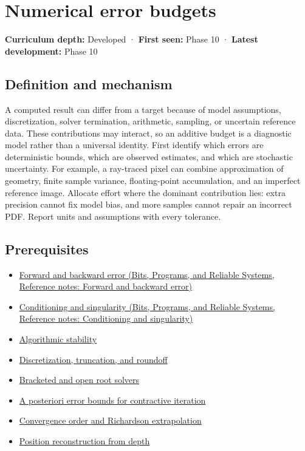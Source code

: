 \hypertarget{appendix-31b8c295e05f}{}\label{referencestart:appendix-31b8c295e05f}
\section{Numerical error budgets}\label{appendix-31b8c295e05f-numerical-error-budgets}

\textbf{Curriculum depth:} Developed · \textbf{First seen:} Phase 10 · \textbf{Latest development:} Phase 10

\subsection{Definition and mechanism}\label{appendix-31b8c295e05f-definition-and-mechanism}

A computed result can differ from a target because of model assumptions, discretization, solver termination, arithmetic, sampling, or uncertain reference data. These contributions may interact, so an additive budget is a diagnostic model rather than a universal identity. First identify which errors are deterministic bounds, which are observed estimates, and which are stochastic uncertainty. For example, a ray-traced pixel can combine approximation of geometry, finite sample variance, floating-point accumulation, and an imperfect reference image. Allocate effort where the dominant contribution lies: extra precision cannot fix model bias, and more samples cannot repair an incorrect PDF. Report units and assumptions with every tolerance.

\subsection{Prerequisites}\label{appendix-31b8c295e05f-prerequisites}

\begin{itemize}
\tightlist
\item
  \href{../01-Bits-Programs-and-Reliable-Systems/main.pdf\#nameddest=appendix-a7fbaf6d1b1c}{Forward and backward error (Bits, Programs, and Reliable Systems, Reference notes: Forward and backward error)}
\item
  \href{../01-Bits-Programs-and-Reliable-Systems/main.pdf\#nameddest=appendix-8f6a01f284a7}{Conditioning and singularity (Bits, Programs, and Reliable Systems, Reference notes: Conditioning and singularity)}
\item
  \hyperref[appendix-aa2bf0d79639]{Algorithmic stability}
\item
  \hyperref[appendix-6b0648b2b8e8]{Discretization, truncation, and roundoff}
\item
  \hyperref[appendix-f63eb850796d]{Bracketed and open root solvers}
\item
  \hyperref[appendix-d83b0ad1be7f]{A posteriori error bounds for contractive iteration}
\item
  \hyperref[appendix-aca80b6bf17a]{Convergence order and Richardson extrapolation}
\item
  \hyperref[appendix-2cbf2968e866]{Position reconstruction from depth}
\end{itemize}

